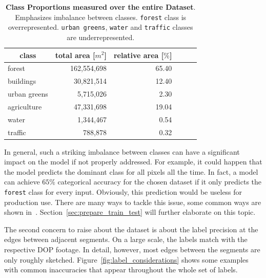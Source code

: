 \begin{table}[h]
\centering
\caption[Class Proportions measured over the entire Dataset]
{\textbf{Class Proportions measured over the entire Dataset}. Emphasizes imbalance between classes. \texttt{forest} class is overrepresented. \texttt{urban greens}, \texttt{water} and \texttt{traffic} classes are underrepresented.}
\label{tab:seg-breakdown}
\begin{tabular}{|l|r|r|r|r|r|}
\hline
\multicolumn{1}{|c|}{\textbf{class}} &
  \multicolumn{1}{c|}{\textbf{total area [$m^2$]}} &
  \multicolumn{1}{c|}{\textbf{relative area [$\%$]}} \\ \hline
forest       & 162,554,698 & 65.40  \\ \hline
buildings    & 30,821,514  & 12.40  \\ \hline
urban greens & 5,715,026   & 2.30   \\ \hline
agriculture  & 47,331,698  & 19.04  \\ \hline
water        & 1,344,467   & 0.54   \\ \hline
traffic      & 788,878     & 0.32   \\ \hline
\end{tabular}
\end{table}

In general, such a striking imbalance between classes can have a significant impact on the model if not properly addressed. For example, it could happen that the model predicts the dominant class for all pixels all the time. In fact, a model can achieve $65\%$ categorical accuracy for the chosen dataset if it only predicts the \texttt{forest} class for every input. Obviously, this prediction would be useless for production use. There are many ways to tackle this issue, some common ways are shown in~\cite{imbalanced_data09}. Section~\ref{sec:prepare_train_test} will further elaborate on this topic.

The second concern to raise about the dataset is about the label precision at the edges between adjacent segments. On a large scale, the labels match with the respective DOP footage. In detail, however, most edges between the segments are only roughly sketched. Figure~\ref{fig:label_considerations} shows some examples with common inaccuracies that appear throughout the whole set of labels.

